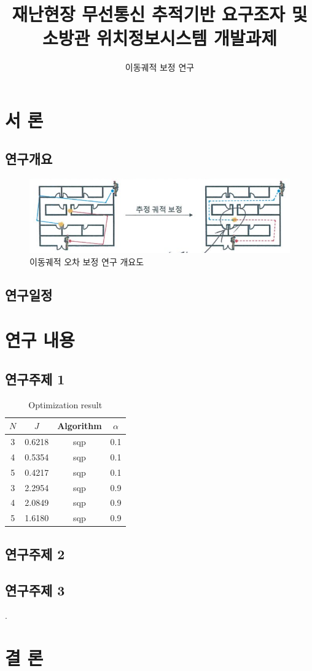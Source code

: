 \documentclass{finalReport}
\title{재난현장 무선통신 추적기반 요구조자 및 소방관 위치정보시스템 개발과제} %
\subtitle{이동궤적 보정 연구} %
\begin{document}
\maketitle
\pagestyle{empty}
\tableofcontents
\listoffigures
\listoftables
\clearpage
\setcounter{page}{1}
\pagestyle{plain}
\section{서 론}
\subsection{연구개요}
\lipsum[1]
\begin{figure}[h]
	\centering
	\includegraphics[width=.9\columnwidth]{figures/Section1/overview.png}
	\caption{이동궤적 오차 보정 연구 개요도}
	\label{fig:overview}
\end{figure}
\subsection{연구일정}
\lipsum[2]
\section{연구 내용}
\subsection{연구주제 1}
\begin{table}[ht!]
    \centering
    \begin{tabular}{c c c c}
        \hline \hline
        $N$ & $J$ &  Algorithm & $\alpha$\\
        \hline
        3 & 0.6218 & sqp & 0.1\\
        4 & 0.5354 & sqp & 0.1\\
        5 & 0.4217 & sqp & 0.1\\
        \hline
        3 & 2.2954 & sqp & 0.9\\
        4 & 2.0849 & sqp & 0.9\\
        5 & 1.6180 & sqp & 0.9\\
        \hline \hline
    \end{tabular}
    \caption{Optimization result}
    \label{table:optimization_result}
\end{table}
\subsection{연구주제 2}
\subsection{연구주제 3}
\lipsum[3] \cite{lee2020vector}.
\section{결 론}
\lipsum[4]



\end{document}
